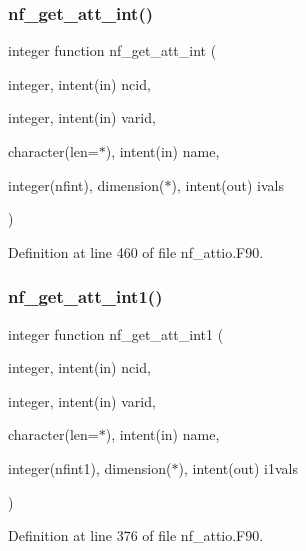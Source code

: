 \subsubsection{\texorpdfstring{nf\+\_\+get\+\_\+att\+\_\+int()}{nf\_get\_att\_int()}}
{\footnotesize\ttfamily integer function nf\+\_\+get\+\_\+att\+\_\+int (\begin{DoxyParamCaption}\item[{integer, intent(in)}]{ncid,  }\item[{integer, intent(in)}]{varid,  }\item[{character(len=$\ast$), intent(in)}]{name,  }\item[{integer(nfint), dimension($\ast$), intent(out)}]{ivals }\end{DoxyParamCaption})}



Definition at line 460 of file nf\+\_\+attio.\+F90.

\mbox{\label{nf__attio_8F90_abd56e4abcec624f4ca5a26c93ed87c18}} 
\subsubsection{\texorpdfstring{nf\+\_\+get\+\_\+att\+\_\+int1()}{nf\_get\_att\_int1()}}
{\footnotesize\ttfamily integer function nf\+\_\+get\+\_\+att\+\_\+int1 (\begin{DoxyParamCaption}\item[{integer, intent(in)}]{ncid,  }\item[{integer, intent(in)}]{varid,  }\item[{character(len=$\ast$), intent(in)}]{name,  }\item[{integer(nfint1), dimension($\ast$), intent(out)}]{i1vals }\end{DoxyParamCaption})}



Definition at line 376 of file nf\+\_\+attio.\+F90.

\mbox{\label{nf__attio_8F90_a0435d47b0fa8d542ab699b1c398a4076}} 
